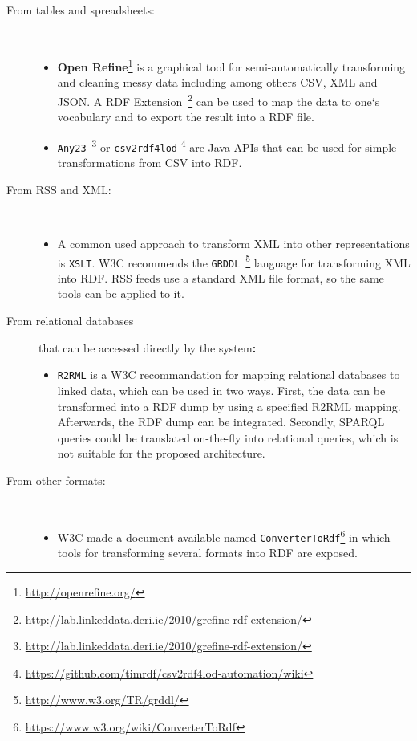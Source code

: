 \documentclass{article}
\begin{document}
\begin{description}
 	\item[\small From tables and spreadsheets:] $ $
 	\begin{itemize}
 		\item \textbf{Open Refine}\footnote{\url{http://openrefine.org/}} is a graphical tool for semi-automatically transforming and cleaning messy data including among others CSV, XML and JSON. A RDF Extension~\footnote{\url{http://lab.linkeddata.deri.ie/2010/grefine-rdf-extension/}} can be used to map the data to one`s vocabulary and to export the result into a RDF file.
 		\item \texttt{Any23}~\footnote{\url{http://lab.linkeddata.deri.ie/2010/grefine-rdf-extension/}} or  \texttt{csv2rdf4lod} \footnote{\url{https://github.com/timrdf/csv2rdf4lod-automation/wiki}} are Java APIs that can be used for simple transformations from CSV into RDF.
	\end{itemize}
	\item[\small From RSS and XML:] $ $
	\begin{itemize}
		\item A common used approach to transform XML into other representations is \texttt{XSLT}. W3C recommends the \texttt{GRDDL}~\footnote{\url{http://www.w3.org/TR/grddl/}} language for transforming XML into RDF. RSS feeds use a standard XML file format, so the same tools can be applied to it.
	\end{itemize}
	\item[\small From relational databases]  that can be accessed directly by the system\textbf{:}
	\begin{itemize}
		\item \texttt{R2RML} is a W3C recommandation for mapping relational databases to linked data, which can be used in two ways. First, the data can be transformed into a RDF dump by using a specified R2RML mapping. Afterwards, the RDF dump can be integrated. Secondly, SPARQL queries could be translated on-the-fly into relational queries, which is not suitable for the proposed architecture.
	\end{itemize}
	\item[\small From other formats:] $ $
	\begin{itemize}
		\item W3C made a document available named \texttt{ConverterToRdf}\footnote{\url{https://www.w3.org/wiki/ConverterToRdf}} in which tools for transforming several formats into RDF are exposed.
	\end{itemize}
\end{description}
\end{document}
